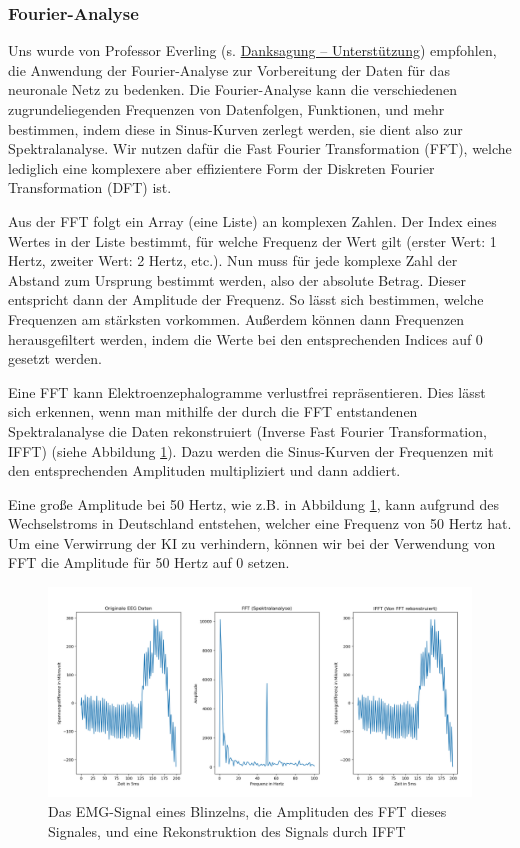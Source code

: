 \documentclass[11pt]{scrartcl}
\begin{document}
	\subsubsection{Fourier-Analyse}
	
	Uns wurde von Professor Everling (s. \hyperref[Unterstuetzung]{Danksagung -- Unterstützung}) empfohlen, die Anwendung der Fourier-Analyse zur Vorbereitung der Daten für das neuronale Netz zu bedenken. Die Fourier-Analyse kann die verschiedenen zugrundeliegenden Frequenzen von Datenfolgen, Funktionen, und mehr bestimmen, indem diese in Sinus-Kurven zerlegt werden, sie dient also zur Spektralanalyse. \cite{3b1b:fft} Wir nutzen dafür die Fast Fourier Transformation (FFT), welche lediglich eine komplexere aber effizientere Form der Diskreten Fourier Transformation (DFT) ist. \cite{FFT-DFT}

	Aus der FFT folgt ein Array (eine Liste) an komplexen Zahlen. Der Index eines Wertes in der Liste bestimmt, für welche Frequenz der Wert gilt (erster Wert: 1 Hertz, zweiter Wert: 2 Hertz, etc.). Nun muss für jede komplexe Zahl der Abstand zum Ursprung bestimmt werden, also der absolute Betrag. Dieser entspricht dann der Amplitude der Frequenz. So lässt sich bestimmen, welche Frequenzen am stärksten vorkommen. Außerdem können dann Frequenzen herausgefiltert werden, indem die Werte bei den entsprechenden Indices auf 0 gesetzt werden. 

	Eine FFT kann Elektroenzephalogramme verlustfrei repräsentieren. Dies lässt sich erkennen, wenn man mithilfe der durch die FFT entstandenen Spektralanalyse die Daten rekonstruiert (Inverse Fast Fourier Transformation, IFFT) (siehe Abbildung \ref{EEG-IFFT}). Dazu werden die Sinus-Kurven der Frequenzen mit den entsprechenden Amplituden multipliziert und dann addiert.

	Eine große Amplitude bei 50 Hertz, wie z.B. in Abbildung \ref{EEG-IFFT}, kann aufgrund des Wechselstroms in Deutschland entstehen, welcher eine Frequenz von 50 Hertz hat. \cite{Praktikum} Um eine Verwirrung der KI zu verhindern, können wir bei der Verwendung von FFT die Amplitude für 50 Hertz auf 0 setzen.

	\begin{figure}[h!]
		\includegraphics[width=\textwidth]{pictures/blink_fft_ifft.png}
		\caption{Das EMG-Signal eines Blinzelns, die Amplituden des FFT dieses Signales, und eine Rekonstruktion des Signals durch IFFT}
		\label{EEG-IFFT}
	\end{figure}
\end{document}
